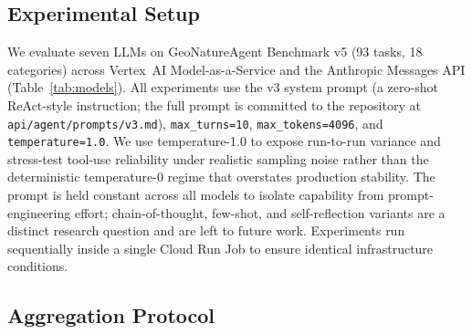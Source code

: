 \documentclass[10pt,twocolumn]{article}
\begin{document}
\subsection{Experimental Setup}

We evaluate seven LLMs on GeoNatureAgent Benchmark v5 (93 tasks, 18 categories) across Vertex~AI Model-as-a-Service and the Anthropic Messages API (Table~\ref{tab:models}). All experiments use the v3 system prompt (a zero-shot ReAct-style instruction; the full prompt is committed to the repository at \texttt{api/agent/prompts/v3.md}), \texttt{max\_turns=10}, \texttt{max\_tokens=4096}, and \texttt{temperature=1.0}. We use temperature-1.0 to expose run-to-run variance and stress-test tool-use reliability under realistic sampling noise rather than the deterministic temperature-0 regime that overstates production stability. The prompt is held constant across all models to isolate capability from prompt-engineering effort; chain-of-thought, few-shot, and self-reflection variants are a distinct research question and are left to future work. Experiments run sequentially inside a single Cloud Run Job to ensure identical infrastructure conditions.

\begin{table}[t]
\caption{Models evaluated. Six via Vertex AI; Claude via the Anthropic Messages API.}
\label{tab:models}
\centering
\small
{}
\end{table}


\subsection{Aggregation Protocol}
\label{sec:aggregation}
\end{document}
